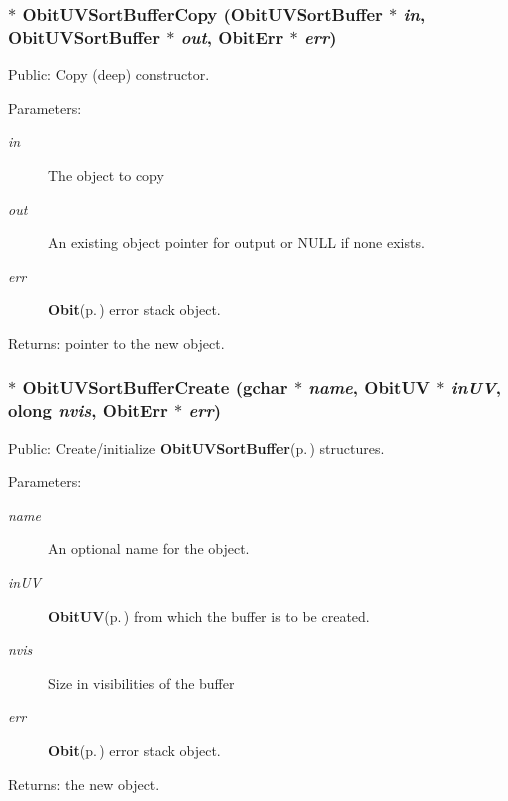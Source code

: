 \subsubsection{$\ast$ Obit\-UVSort\-Buffer\-Copy ({\bf Obit\-UVSort\-Buffer} $\ast$ {\em in}, {\bf Obit\-UVSort\-Buffer} $\ast$ {\em out}, {\bf Obit\-Err} $\ast$ {\em err})}\label{ObitUVSortBuffer_8c_a9}


Public: Copy (deep) constructor. 

\begin{Desc}
\item[Parameters:]
\begin{description}
\item[{\em in}]The object to copy \item[{\em out}]An existing object pointer for output or NULL if none exists. \item[{\em err}]{\bf Obit}{\rm (p.\,\pageref{structObit})} error stack object. \end{description}
\end{Desc}
\begin{Desc}
\item[Returns:]pointer to the new object. \end{Desc}
\subsubsection{$\ast$ Obit\-UVSort\-Buffer\-Create (gchar $\ast$ {\em name}, {\bf Obit\-UV} $\ast$ {\em in\-UV}, {\bf olong} {\em nvis}, {\bf Obit\-Err} $\ast$ {\em err})}\label{ObitUVSortBuffer_8c_a11}


Public: Create/initialize {\bf Obit\-UVSort\-Buffer}{\rm (p.\,\pageref{structObitUVSortBuffer})} structures. 

\begin{Desc}
\item[Parameters:]
\begin{description}
\item[{\em name}]An optional name for the object. \item[{\em in\-UV}]{\bf Obit\-UV}{\rm (p.\,\pageref{structObitUV})} from which the buffer is to be created. \item[{\em nvis}]Size in visibilities of the buffer \item[{\em err}]{\bf Obit}{\rm (p.\,\pageref{structObit})} error stack object. \end{description}
\end{Desc}
\begin{Desc}
\item[Returns:]the new object. \end{Desc}
